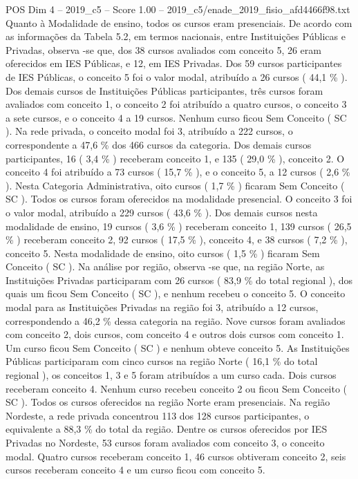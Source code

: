\begin{textsample}{POS Dim 4 – 2019\_c5 – Score 1.00 – 2019\_c5/enade\_2019\_fisio\_afd4466f98.txt}
Quanto à Modalidade de ensino, todos os cursos eram presenciais.
De acordo com as informações da Tabela 5.2, em termos nacionais, entre Instituições Públicas e Privadas, observa -se que, dos 38 cursos avaliados com conceito 5, 26 eram oferecidos em IES Públicas, e 12, em IES Privadas.
Dos 59 cursos participantes de IES Públicas, o conceito 5 foi o valor modal, atribuído a 26 cursos ( 44,1 \% ).
Dos demais cursos de Instituições Públicas participantes, três cursos foram avaliados com conceito 1, o conceito 2 foi atribuído a quatro cursos, o conceito 3 a sete cursos, e o conceito 4 a 19 cursos.
Nenhum curso ficou Sem Conceito ( SC ).
Na rede privada, o conceito modal foi 3, atribuído a 222 cursos, o correspondente a 47,6 \% dos 466 cursos da categoria.
Dos demais cursos participantes, 16 ( 3,4 \% ) receberam conceito 1, e 135 ( 29,0 \% ), conceito 2.
O conceito 4 foi atribuído a 73 cursos ( 15,7 \% ), e o conceito 5, a 12 cursos ( 2,6 \% ).
Nesta Categoria Administrativa, oito cursos ( 1,7 \% ) ficaram Sem Conceito ( SC ).
Todos os cursos foram oferecidos na modalidade presencial.
O conceito 3 foi o valor modal, atribuído a 229 cursos ( 43,6 \% ).
Dos demais cursos nesta modalidade de ensino, 19 cursos ( 3,6 \% ) receberam conceito 1, 139 cursos ( 26,5 \% ) receberam conceito 2, 92 cursos ( 17,5 \% ), conceito 4, e 38 cursos ( 7,2 \% ), conceito 5.
Nesta modalidade de ensino, oito cursos ( 1,5 \% ) ficaram Sem Conceito ( SC ).
Na análise por região, observa -se que, na região Norte, as Instituições Privadas participaram com 26 cursos ( 83,9 \% do total regional ), dos quais um ficou Sem Conceito ( SC ), e nenhum recebeu o conceito 5.
O conceito modal para as Instituições Privadas na região foi 3, atribuído a 12 cursos, correspondendo a 46,2 \% dessa categoria na região.
Nove cursos foram avaliados com conceito 2, dois cursos, com conceito 4 e outros dois cursos com conceito 1.
Um curso ficou Sem Conceito ( SC ) e nenhum obteve conceito 5.
As Instituições Públicas participaram com cinco cursos na região Norte ( 16,1 \% do total regional ), os conceitos 1, 3 e 5 foram atribuídos a um curso cada.
Dois cursos receberam conceito 4.
Nenhum curso recebeu conceito 2 ou ficou Sem Conceito ( SC ).
Todos os cursos oferecidos na região Norte eram presenciais.
Na região Nordeste, a rede privada concentrou 113 dos 128 cursos participantes, o equivalente a 88,3 \% do total da região.
Dentre os cursos oferecidos por IES Privadas no Nordeste, 53 cursos foram avaliados com conceito 3, o conceito modal.
Quatro cursos receberam conceito 1, 46 cursos obtiveram conceito 2, seis cursos receberam conceito 4 e um curso ficou com conceito 5.

\end{textsample}
